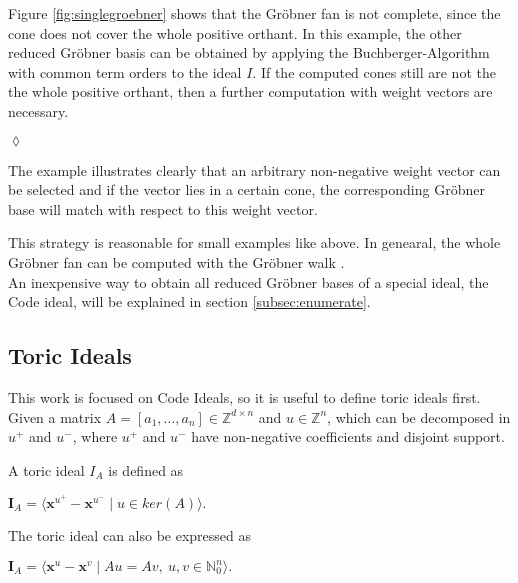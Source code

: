 \begin{env_example}
Figure \ref{fig:singlegroebner} shows that the Gröbner fan is not complete, since the cone does not cover the whole positive orthant. In this example, the other reduced Gröbner basis can be obtained by applying the Buchberger-Algorithm with common term orders to the ideal $I$.
If the computed cones still are not the the whole positive orthant, then a further computation with weight vectors are necessary.
\begin{flushright}
$\lozenge$
\end{flushright} 
\end{env_example}

The example illustrates clearly that an arbitrary non-negative weight vector can be selected and if the vector lies in a certain cone, the corresponding Gröbner base will match with respect to this weight vector.  


This strategy is reasonable for small examples like above.
In genearal, the whole Gröbner fan can be computed with the Gröbner walk \cite{coxOshea}.\\
An inexpensive way to obtain all reduced Gröbner bases of a special ideal, the Code ideal, will be explained in section \ref{subsec:enumerate}.

\newpage
\subsection{Toric Ideals}
\label{subsec:toric}
This work is focused on Code Ideals, so it is useful to define toric ideals first. Given a matrix $A =\left[a_{1},\dots, a_{n}  \right] \in \mathbb{Z}^{d \times n } $ and $u \in \mathbb{Z}^{n}$, which can be decomposed in $u^{+} $ and $u^{-}$, where $u^{+} $ and $u^{-}$ have non-negative coefficients and disjoint support.

\begin{env_definition}
\cite{dueckjournal} A toric ideal $I_{A}$ is defined as
\begin{center}
$ \textbf{I}_{A} = \langle \textbf{x}^{u^{+}} - \textbf{x}^{u^{-}} \mid u \in ker \left(  A \right) \rangle . $
\end{center}


\end{env_definition}

The toric ideal can also be expressed as
\begin{center}
$ \textbf{I}_{A} =  \langle \textbf{x}^{u} - \textbf{x}^{v} \mid Au = Av,~ u,v \in \mathbb{N}^{n}_{0} \rangle .$
\end{center}

\newpage



